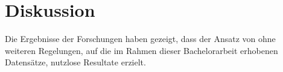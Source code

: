 
\section{Diskussion}
\label{sec:kapitel_5}
Die Ergebnisse der Forschungen haben gezeigt, dass der Ansatz von \citet{acharyaBIMPoseNetIndoorCamera2019} ohne weiteren Regelungen, auf die im Rahmen dieser Bachelorarbeit erhobenen Datensätze, nutzlose Resultate erzielt.